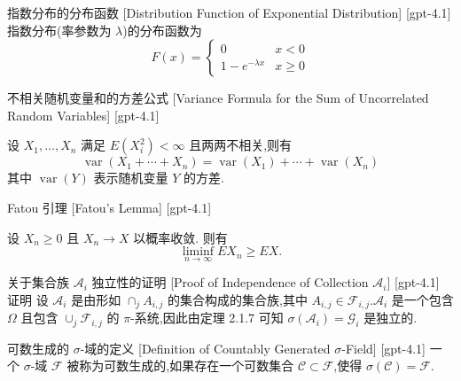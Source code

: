 \documentclass[UTF8]{ctexart}
\begin{document}
    
    
    \begin{dfn}
        {指数分布的分布函数}
        [Distribution Function of Exponential Distribution]
        [gpt-4.1]
        指数分布(率参数为 $\lambda$)的分布函数为
\[
F(x) =
\begin{cases}
0 & x < 0 \\
1 - e^{-\lambda x} & x \geq 0
\end{cases}
\]
    \end{dfn}
    
    
    
    \begin{thm}
        {不相关随机变量和的方差公式}
        [Variance Formula for the Sum of Uncorrelated Random Variables]
        [gpt-4.1]
        
设 $X_1, \ldots, X_n$ 满足 $E(X_i^2) < \infty$ 且两两不相关,则有
\[
\operatorname{var}(X_1 + \cdots + X_n) = \operatorname{var}(X_1) + \cdots + \operatorname{var}(X_n)
\]
其中 $\operatorname{var}(Y)$ 表示随机变量 $Y$ 的方差.

    \end{thm}
    
    
    
    \begin{lma}
        {Fatou 引理}
        [Fatou's Lemma]
        [gpt-4.1]
        
设 $X_n \geq 0$ 且 $X_n \to X$ 以概率收敛.
则有
\[
\liminf_{n \to \infty} E X_n \geq E X.
\]

    \end{lma}
    
    
    
    \begin{prf}
        {关于集合族 $\mathcal{A}_i$ 独立性的证明}
        [Proof of Independence of Collection $\mathcal{A}_i$]
        [gpt-4.1]
        证明 设 $\mathcal{A}_i$ 是由形如 $\cap_{j} A_{i, j}$ 的集合构成的集合族,其中 $A_{i, j} \in \mathcal{F}_{i, j}$.$\mathcal{A}_i$ 是一个包含 $\Omega$ 且包含 $\cup_{j} \mathcal{F}_{i, j}$ 的 $\pi$-系统,因此由定理 2.1.7 可知 $\sigma(\mathcal{A}_i) = \mathcal{G}_i$ 是独立的.
    \end{prf}
    
    
    
    \begin{dfn}
        {可数生成的 $\sigma$-域的定义}
        [Definition of Countably Generated $\sigma$-Field]
        [gpt-4.1]
        一个 $\sigma$-域 $\mathcal{F}$ 被称为可数生成的,如果存在一个可数集合 $\mathcal{C} \subset \mathcal{F}$,使得 $\sigma(\mathcal{C}) = \mathcal{F}$.
    \end{dfn}
    
\end{document}
